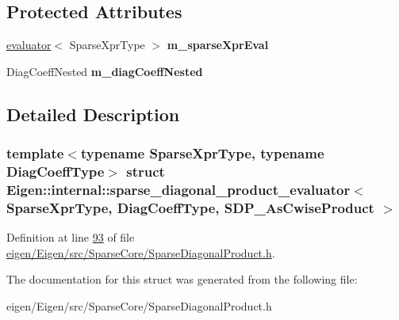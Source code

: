 \subsection*{Protected Attributes}
\begin{DoxyCompactItemize}
\item 
\mbox{\label{struct_eigen_1_1internal_1_1sparse__diagonal__product__evaluator_3_01_sparse_xpr_type_00_01_diag5c533b27b8fe485cf13e7ad699b99003_a6f4cc4f89a160052c871533eb91c5655}} 
\hyperlink{struct_eigen_1_1internal_1_1evaluator}{evaluator}$<$ Sparse\+Xpr\+Type $>$ {\bfseries m\+\_\+sparse\+Xpr\+Eval}
\item 
\mbox{\label{struct_eigen_1_1internal_1_1sparse__diagonal__product__evaluator_3_01_sparse_xpr_type_00_01_diag5c533b27b8fe485cf13e7ad699b99003_a7409f9ccdab3310c04bc195a04f5d8e0}} 
Diag\+Coeff\+Nested {\bfseries m\+\_\+diag\+Coeff\+Nested}
\end{DoxyCompactItemize}


\subsection{Detailed Description}
\subsubsection*{template$<$typename Sparse\+Xpr\+Type, typename Diag\+Coeff\+Type$>$\newline
struct Eigen\+::internal\+::sparse\+\_\+diagonal\+\_\+product\+\_\+evaluator$<$ Sparse\+Xpr\+Type, Diag\+Coeff\+Type, S\+D\+P\+\_\+\+As\+Cwise\+Product $>$}



Definition at line \hyperlink{eigen_2_eigen_2src_2_sparse_core_2_sparse_diagonal_product_8h_source_l00093}{93} of file \hyperlink{eigen_2_eigen_2src_2_sparse_core_2_sparse_diagonal_product_8h_source}{eigen/\+Eigen/src/\+Sparse\+Core/\+Sparse\+Diagonal\+Product.\+h}.



The documentation for this struct was generated from the following file\+:\begin{DoxyCompactItemize}
\item 
eigen/\+Eigen/src/\+Sparse\+Core/\+Sparse\+Diagonal\+Product.\+h\end{DoxyCompactItemize}
